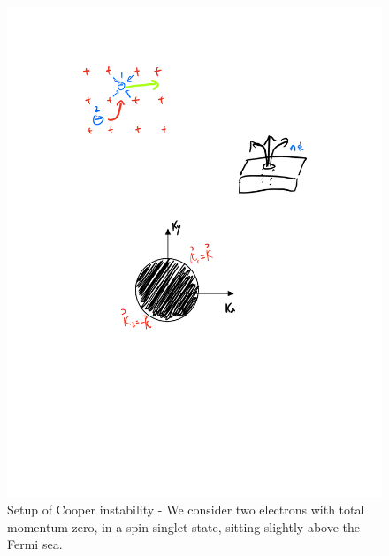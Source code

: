 \begin{figure}[htbp]
    \centering
    \includegraphics[scale=0.7]{Images/fig-cooperpairsetup.pdf}
    \caption{Setup of Cooper instability - We consider two electrons with total momentum zero, in a spin singlet state, sitting slightly above the Fermi sea.}
    \label{fig-cooperpairsetup}
\end{figure}

